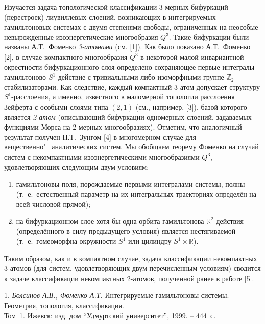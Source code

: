 \vzmscaption

Изучается задача топологической классификации 3-мер\-ных бифуркаций (перестроек) лиувиллевых слоений, возникающих в интегрируемых гамильтоновых системах с двумя степенями свободы, ограниченных на неособые невырожденные изоэнергетические многообразия $Q^3$. Такие бифуркации были названы А.Т.~Фоменко {\it 3-атомами} (см. [1]). Как было показано А.Т.~Фоменко [2], в случае компактного многообразия $Q^3$ в некоторой малой инвариантной окрестности бифуркационного слоя определено сохраняющее первые интегралы гамильтоново $S^1$-действие с тривиальными либо изоморфными группе $\mathbb Z_2$ стабилизаторами. Как следствие, каждый компактный 3-атом допускает структуру $S^1$-расслоения, а именно, известного в маломерной топологии расслоения Зейферта с особыми слоями типа $(2,1)$ (см., например, [3]), базой которого является {\it 2-атом} (описывающий бифуркации одномерных слоений, задаваемых функциями Морса на 2-мерных многообразиях). Отметим, что аналогичный результат получен Н.Т.~Зунгом [4] в многомерном случае для вещественно"=аналитических систем. Мы обобщаем теорему Фоменко на случай систем с некомпактными изоэнергетическими многообразиями $Q^3$, удовлетворяющих следующим двум условиям:
\begin{enumerate}
	\item гамильтоновы поля, порождаемые первыми интегралами системы, полны (т.~е.~естественный параметр на их интегральных траекториях определён на всей числовой прямой);
	\item на бифуркационном слое хотя бы одна орбита гамильтонова $\mathbb R^2$-действия (определённого в силу предыдущего условия) является нестягиваемой (т.~е.~гомеоморфна окружности $S^1$ или цилиндру $S^1\times\mathbb R$).
\end{enumerate}
Таким образом, как и в компактном случае, задача классификации некомпактных 3-атомов (для систем, удовлетворяющих двум перечисленным условиям) сводится к задаче классификации некомпактных 2-атомов, полученной ранее в работе [5].



\litlist

1. {\it Болсинов А.В., Фоменко А.Т.} Интегрируемые гамильтоновы системы. Геометрия, топология, классификация. \\ Том~1. Ижевск: изд. дом ``Удмуртский университет'', 1999. -- 444~с.

